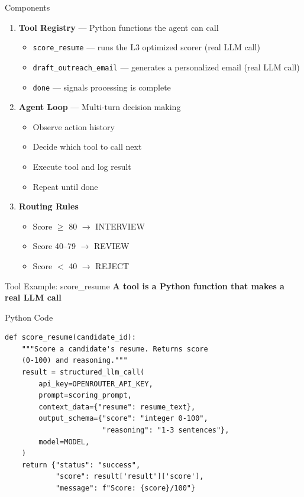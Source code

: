 \documentclass[aspectratio=169]{beamer}
\begin{document}
\begin{frame}{Components}

\begin{enumerate}
    \item \textbf{Tool Registry} --- Python functions the agent can call
    \begin{itemize}
        \item \texttt{score\_resume} --- runs the L3 optimized scorer (real LLM call)
        \item \texttt{draft\_outreach\_email} --- generates a personalized email (real LLM call)
        \item \texttt{done} --- signals processing is complete
    \end{itemize}
    \vspace{0.2cm}

    \item \textbf{Agent Loop} --- Multi-turn decision making
    \begin{itemize}
        \item Observe action history
        \item Decide which tool to call next
        \item Execute tool and log result
        \item Repeat until done
    \end{itemize}
    \vspace{0.2cm}

    \item \textbf{Routing Rules}
    \begin{itemize}
        \item Score $\geq$ 80 $\rightarrow$ INTERVIEW
        \item Score 40--79 $\rightarrow$ REVIEW
        \item Score $<$ 40 $\rightarrow$ REJECT
    \end{itemize}
\end{enumerate}
\end{frame}


\begin{frame}[fragile]{Tool Example: score\_resume}
\textbf{A tool is a Python function that makes a real LLM call}
\vspace{0.2cm}

\begin{block}{Python Code}
{\small
\begin{verbatim}
def score_resume(candidate_id):
    """Score a candidate's resume. Returns score
    (0-100) and reasoning."""
    result = structured_llm_call(
        api_key=OPENROUTER_API_KEY,
        prompt=scoring_prompt,
        context_data={"resume": resume_text},
        output_schema={"score": "integer 0-100",
                       "reasoning": "1-3 sentences"},
        model=MODEL,
    )
    return {"status": "success",
            "score": result['result']['score'],
            "message": f"Score: {score}/100"}
\end{verbatim}
}
\end{block}

\end{frame}
\end{document}
